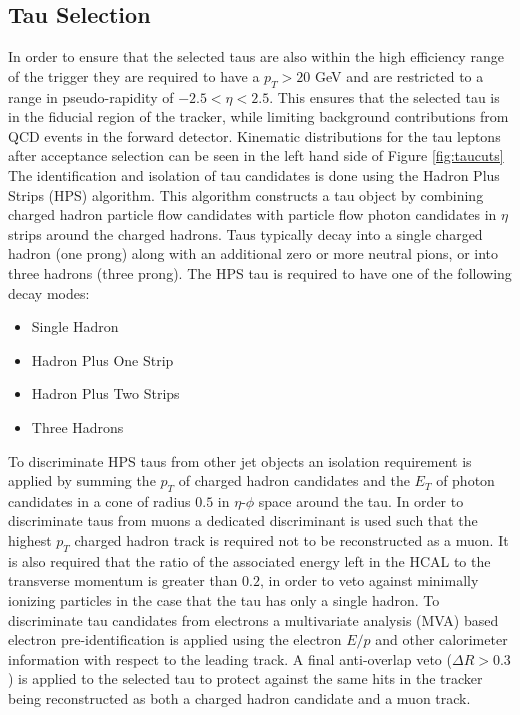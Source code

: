 \subsection{Tau Selection}
\label{sec:tauselection}
In order to ensure that the selected taus are also within the high efficiency range of the trigger they are required to have a $p_{T} > 20$ GeV and are restricted to a range in pseudo-rapidity of  $-2.5 < \eta < 2.5$. 
This ensures that the selected tau is in the fiducial region of the tracker, while limiting background contributions from QCD events in the forward detector.
Kinematic distributions for the tau leptons after acceptance selection can be seen in the left hand side of Figure \ref{fig:taucuts}
The identification and isolation of tau candidates is done using the Hadron Plus Strips (HPS) algorithm\cite{HPS}.
This algorithm constructs a tau object by combining charged hadron particle flow candidates with particle flow photon candidates in $\eta$ strips around the charged hadrons.
Taus typically decay into a single charged hadron (one prong) along with an additional zero or more neutral pions, or into three hadrons (three prong).
The HPS tau is required to have one of the following decay modes:
\begin{itemize}
\item Single Hadron
\item Hadron Plus One Strip
\item Hadron Plus Two Strips
\item Three Hadrons
\end{itemize}
To discriminate HPS taus from other jet objects an isolation requirement is applied by summing the $p_{T}$ of charged hadron candidates and the $E_{T}$ of photon candidates in a cone of radius $0.5$ in $\eta$-$\phi$ space around the tau.
In order to discriminate taus from muons a dedicated discriminant is used such that the highest $p_{T}$ charged hadron track is required not to be reconstructed as a muon.
It is also required that the ratio of the associated energy left in the HCAL to the transverse momentum is greater than $0.2$, in order to veto against minimally ionizing particles in the case that the tau has only a single hadron. 
To discriminate tau candidates from electrons a multivariate analysis (MVA) based electron pre-identification is applied using the electron $E/p$ and other calorimeter information with respect to the leading track.
A final anti-overlap veto ($\Delta R > 0.3$) is applied to the selected tau to protect against the same hits in the tracker being reconstructed as both a charged hadron candidate and a muon track.
